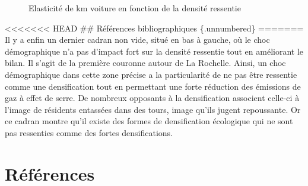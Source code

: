 \documentclass[
  9pt,
  a4paper,
  DIV=11]{scrreprt}
\begin{document}
\begin{figure}[htb]

\caption{\label{fig-elas-km-pwd}Elasticité de km voiture en fonction de
la densité ressentie}


\end{figure}%

\textless\textless\textless\textless\textless\textless\textless{} HEAD
\#\# Références bibliographiques \{.unnumbered\} ======= Il y a enfin un
dernier cadran non vide, situé en bas à gauche, où le choc démographique
n'a pas d'impact fort sur la densité ressentie tout en améliorant le
bilan. Il s'agit de la première couronne autour de La Rochelle. Ainsi,
un choc démographique dans cette zone précise a la particularité de ne
pas être ressentie comme une densification tout en permettant une forte
réduction des émissions de gaz à effet de serre. De nombreux opposants à
la densification associent celle-ci à l'image de résidents entassées
dans des tours, image qu'ils jugent repoussante. Or ce cadran montre
qu'il existe des formes de densification écologique qui ne sont pas
ressenties comme des fortes densifications.

\chapter*{Références}\label{ruxe9fuxe9rences}
\end{document}
